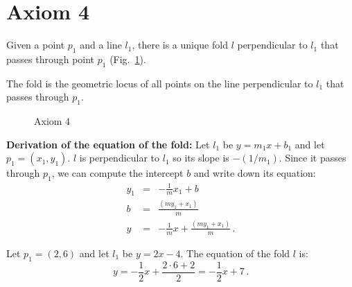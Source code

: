 

\section{Axiom 4}\label{s.ax4}

\begin{axiom}
Given a point $p_1$ and a line $l_1$, there is a unique fold $l$ perpendicular to $l_1$ that passes through point $p_1$ (Fig.~\ref{f.origami-axiom4}).
\end{axiom}

The fold is the geometric locus of all points on the line perpendicular to $l_1$ that passes through $p_1$.

\begin{figure}[ht]
\begin{center}
\end{center}
\caption{Axiom $4$}\label{f.origami-axiom4}
\end{figure}

\noindent\textbf{Derivation of the equation of the fold:}
Let $l_1$ be $y = m_1x + b_1$ and let $p_1=(x_1,y_1)$.  $l$ is perpendicular to $l_1$ so its slope is $-(1/m_1)$. Since it passes through $p_1$, we can compute the intercept $b$ and write down its equation:
%
\begin{eqnarray*}
y_1&=&-\frac{1}{m} x_1 + b\\
b&=& \frac{(my_1+x_1)}{m}\\
y&=&-\frac{1}{m} x +\frac{(my_1+x_1)}{m}\,.
\end{eqnarray*}
\begin{example}
Let $p_1=(2,6)$ and let $l_1$ be $y=2x-4$. The equation of the fold $l$ is:
\[
y=-\frac{1}{2}x + \frac{2\cdot 6 + 2}{2}=-\frac{1}{2}x + 7\,.
\]
\end{example}


